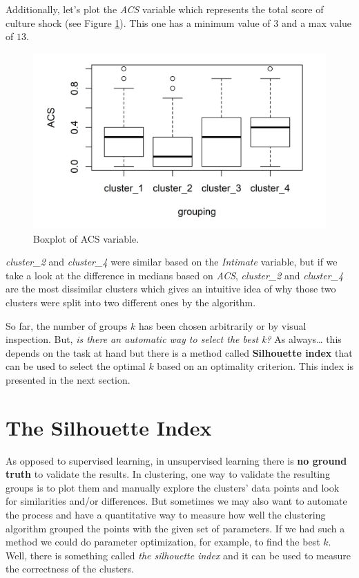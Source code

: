 \documentclass[
  11pt,
]{krantz}
\begin{document}
Additionally, let's plot the \emph{ACS} variable which represents the total score of culture shock (see Figure \ref{fig:bpacs}). This one has a minimum value of \(3\) and a max value of \(13\).

\begin{figure}

{\centering \includegraphics[width=0.9\linewidth]{images/bp_ACS} 

}

\caption{Boxplot of ACS variable.}\label{fig:bpacs}
\end{figure}

\emph{cluster\_2} and \emph{cluster\_4} were similar based on the \emph{Intimate} variable, but if we take a look at the difference in medians based on \emph{ACS}, \emph{cluster\_2} and \emph{cluster\_4} are the most dissimilar clusters which gives an intuitive idea of why those two clusters were split into two different ones by the algorithm.

So far, the number of groups \(k\) has been chosen arbitrarily or by visual inspection. But, \emph{is there an automatic way to select the best k?} As always\ldots{} this depends on the task at hand but there is a method called \textbf{Silhouette index} that can be used to select the optimal \(k\) based on an optimality criterion. This index is presented in the next section.

\hypertarget{the-silhouette-index}{%
\section{The Silhouette Index}\label{the-silhouette-index}}

As opposed to supervised learning, in unsupervised learning there is \textbf{no ground truth} to validate the results. In clustering, one way to validate the resulting groups is to plot them and manually explore the clusters' data points and look for similarities and/or differences. But sometimes we may also want to automate the process and have a quantitative way to measure how well the clustering algorithm grouped the points with the given set of parameters. If we had such a method we could do parameter optimization, for example, to find the best \(k\). Well, there is something called \emph{the silhouette index} \citep{rousseeuw1987} and it can be used to measure the correctness of the clusters.
\end{document}
